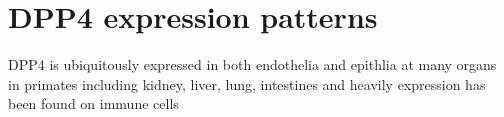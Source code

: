 \section{DPP4 expression patterns}
DPP4 is ubiquitously expressed in both endothelia and epithlia at many organs in primates including kidney, liver, lung, intestines and heavily expression has been found on immune cells